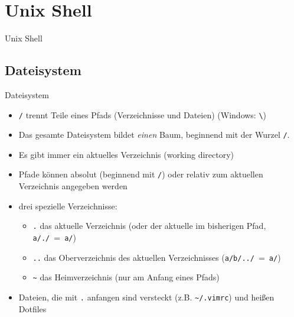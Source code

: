 \section{Unix Shell}
  \begin{frame}{Unix Shell}
    \tableofcontents[sectionstyle=show/hide,
                     hideothersubsections]
  \end{frame}

  \subsection{Dateisystem}
    \begin{frame}{Dateisystem}
      \begin{itemize}
        \item \texttt{/} trennt Teile eines Pfads (Verzeichnisse und Dateien) (Windows: \texttt{\textbackslash})
        \item Das gesamte Dateisystem bildet \emph{einen} Baum, beginnend mit der Wurzel \texttt{/}.
        \item Es gibt immer ein aktuelles Verzeichnis (working directory)
        \item Pfade können absolut (beginnend mit \texttt{/}) oder relativ zum aktuellen Verzeichnis angegeben werden
        \item drei spezielle Verzeichnisse:
          \begin{itemize}
            \item \texttt{.} das aktuelle Verzeichnis (oder der aktuelle im bisherigen Pfad, \texttt{a/./}~=~\texttt{a/})
            \item \texttt{..} das Oberverzeichnis des aktuellen Verzeichnisses (\texttt{a/b/../}~=~\texttt{a/})
            \item \texttt{\textasciitilde} das Heimverzeichnis (nur am Anfang eines Pfads)
          \end{itemize}
        \item Dateien, die mit \texttt{.} anfangen sind versteckt (z.B. \texttt{\textasciitilde/.vimrc}) und heißen Dotfiles
      \end{itemize}
    \end{frame}

